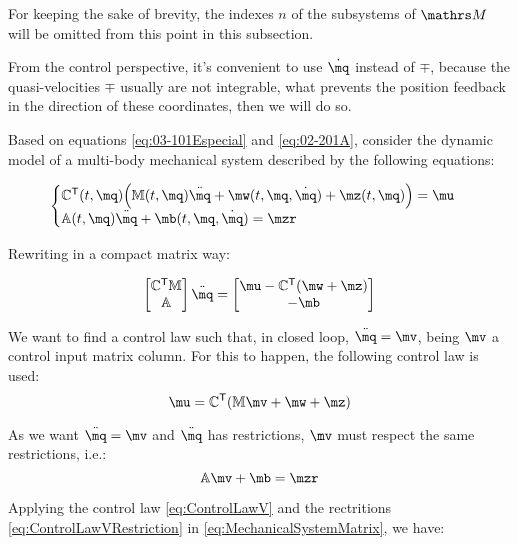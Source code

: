 For keeping the sake of brevity, the indexes $n$ of the subsystems of $\ssM$ will be omitted from this point in this subsection.

From the control perspective, it's convenient to use $\dot{\mq}$ instead of $\mp$, because the quasi-velocities $\mp$ usually are not integrable, what prevents the position feedback in the direction of these coordinates, then we will do so.

Based on equations \eqref{eq:03-101Especial} and \eqref{eq:02-201A}, consider the dynamic model of a multi-body mechanical system described by the following equations:

\begin{equation} \label{eq:MechanicalSystem}
\begin{cases}
\mC^\msT (t, \mq) \Big( \mM (t, \mq) \ddot{\mq} + \mw (t, \mq, \dot{\mq}) + \mz (t, \mq) \Big) = \mu \\
\mA (t, \mq) \ddot{\mq} + \mb (t, \mq, \dot{\mq}) = \mzr
\end{cases}
\end{equation}

Rewriting in a compact matrix way:

\begin{equation} \label{eq:MechanicalSystemMatrix}
\begin{bmatrix}
\mC^\msT \mM \\
\mA
\end{bmatrix}
\ddot{\mq}
=
\begin{bmatrix}
\mu - \mC^\msT(\mw + \mz) \\
-\mb
\end{bmatrix}
\end{equation}

We want to find a control law such that, in closed loop, $ \ddot{\mq} = \mv $, being $\mv$ a control input matrix column. For this to happen, the following control law is used:
\begin{equation} \label{eq:ControlLawV}
\mu = \mC^\msT ( \mM \mv + \mw + \mz )
\end{equation}

As we want $ \ddot{\mq} = \mv $ and $\ddot{\mq}$ has restrictions, $\mv$ must respect the same restrictions, i.e.:
\begin{equation} \label{eq:ControlLawVRestriction}
\mA \mv + \mb = \mzr
\end{equation}

Applying the control law \eqref{eq:ControlLawV} and the rectritions \eqref{eq:ControlLawVRestriction} in \eqref{eq:MechanicalSystemMatrix}, we have: \\

